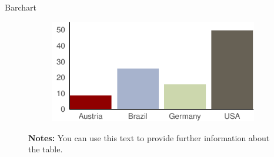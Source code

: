 \documentclass[11pt, aspectratio=169, t]{beamer}
\begin{document}
\begin{frame}{Barchart}
\protect\hypertarget{barchart}{}
\begin{figure}

\caption{\label{fig-barchart}Number of Federal States by Country}

{\centering 

\begin{figure}[H]

{\centering \includegraphics{example_slides_files/figure-beamer/Barchart-1.pdf}

}

\end{figure}

\hypertarget{fig-barchart-1}{}
\vspace{-5pt}
\begin{minipage}{0.9\textwidth}
\scriptsize
\singlespacing
\textbf{Notes:} You can use this text to provide further information about the table. \lipsum[66]
\end{minipage}
\vspace{15pt}

}

\end{figure}
\end{frame}
\end{document}
